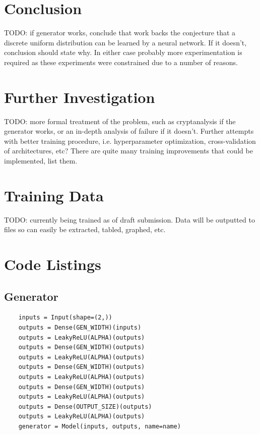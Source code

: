 \documentclass[12pt, titlepage]{report}
\theoremstyle{definition}
\begin{document}
\chapter{Conclusion}\label{chapter:conclusion}
TODO: if generator works, conclude that work backs the conjecture that a discrete uniform distribution can be learned by a neural network. If it doesn't, conclusion should state why. In either case probably more experimentation is required as these experiments were constrained due to a number of reasons.


\chapter{Further Investigation}
TODO: more formal treatment of the problem, such as cryptanalysis if the generator works, or an in-depth analysis of failure if it doesn't. Further attempts with better training procedure, i.e. hyperparameter optimization, cross-validation of architectures, etc? There are quite many training improvements that could be implemented, list them.






\appendix
\chapter{Training Data}
TODO: currently being trained as of draft submission. Data will be outputted to files so can easily be extracted, tabled, graphed, etc.

\chapter{Code Listings}
\section{Generator}\label{appendix:generator}
\begin{verbatim}
    inputs = Input(shape=(2,))
    outputs = Dense(GEN_WIDTH)(inputs)
    outputs = LeakyReLU(ALPHA)(outputs)
    outputs = Dense(GEN_WIDTH)(outputs)
    outputs = LeakyReLU(ALPHA)(outputs)
    outputs = Dense(GEN_WIDTH)(outputs)
    outputs = LeakyReLU(ALPHA)(outputs)
    outputs = Dense(GEN_WIDTH)(outputs)
    outputs = LeakyReLU(ALPHA)(outputs)
    outputs = Dense(OUTPUT_SIZE)(outputs)
    outputs = LeakyReLU(ALPHA)(outputs)
    generator = Model(inputs, outputs, name=name)
\end{verbatim} 
\end{document}
